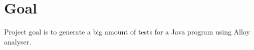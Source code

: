 \section{Goal}
\label{sec:Goal}
Project goal is to generate a big amount of tests for a Java program using Alloy analyser.